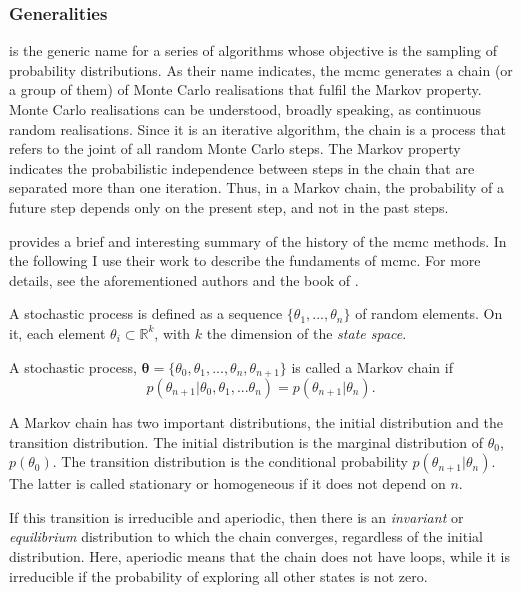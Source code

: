 \subsubsection{Generalities}
 is the generic name for a series of algorithms whose objective is the sampling of probability distributions. As their name indicates, the \gls{mcmc} generates a chain (or a group of them) of Monte Carlo realisations that fulfil the Markov property. Monte Carlo realisations can be understood, broadly speaking, as continuous random realisations. Since it is an iterative algorithm, the chain is a process that refers to the joint of all random Monte Carlo steps. The Markov property indicates the probabilistic independence between steps in the chain that are separated more than one iteration. Thus, in a Markov chain, the probability of a future step depends only on the present step, and not in the past steps.

\citet{Andrieu2003} provides a brief and interesting summary of the history of the \gls{mcmc} methods. In the following I use their work to describe the fundaments of \gls{mcmc}. For more details, see the aforementioned authors and the book of \citet{Brooks2011}.

A stochastic process is defined as a sequence  $\{\theta_1,...,\theta_n\}$ of random elements. On it, each element $\theta_i \subset \mathbb{R}^k$,  with $k$ the dimension of the \emph{state space}. 

A stochastic process, $\boldsymbol{\theta}=\{\theta_0,\theta_1,...,\theta_n,\theta_{n+1}\}$ is called a Markov chain if
\begin{equation}
p(\theta_{n+1} | \theta_0,\theta_1,...\theta_n) = p(\theta_{n+1} |\theta_n). \nonumber
\end{equation}

A Markov chain has two important distributions, the initial distribution and the transition distribution. The initial distribution is the marginal distribution of $\theta_0$, $p(\theta_0)$. The transition distribution is the conditional probability $p(\theta_{n+1} |\theta_n)$. The latter is called stationary or homogeneous if it does not depend on $n$.

{If this transition is irreducible and aperiodic, then there is an \emph{invariant} or \emph{equilibrium} distribution to which the chain converges, regardless of the initial distribution. Here, aperiodic means that the chain does not have loops, while it is irreducible if the probability of exploring all other states is not zero.}

